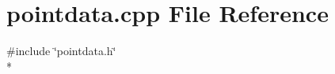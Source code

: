 \section{pointdata.\+cpp File Reference}
\label{bk3_2curve_2pointdata_8cpp}
{\ttfamily \#include \char`\"{}pointdata.\+h\char`\"{}}\\*
